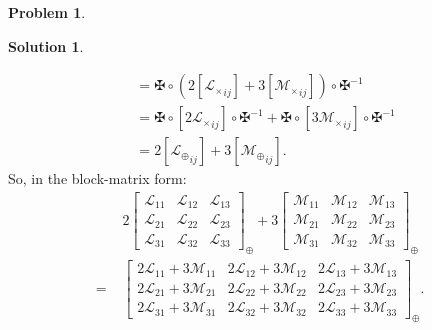 \documentclass{book}
\theoremstyle{definition}
\newtheorem*{prob*}{Problem}
\newtheorem*{sln*}{Solution}
\newcommand{\lag}{\mathcal{L}}
\newcommand{\M}{\mathcal{M}}
\begin{document}
\begin{prob*}
\begin{sln*}
\begin{enumerate}
\begin{enumerate}
\begin{align*}
				[(2\lag_\oplus + 3\M_\oplus)_{ij}]
				&= \maltese\circ \left( 2[{\lag_\times}_{ij} ] + 3[{\M_\times}_{ij} ]  \right) \circ \maltese^{-1}\\
				&= \maltese\circ [2{\lag_\times}_{ij}]\circ \maltese^{-1} + \maltese\circ [3{\M_\times}_{ij}]\circ \maltese^{-1}\\
				&= 2[{\lag_\oplus}_{ij}] + 3[{\M_\oplus}_{ij}].
				\end{align*}
				So, in the block-matrix form:
				\begin{align*}
				&2\begin{bmatrix}
				\lag_{11} & \lag_{12} & \lag_{13}\\
				\lag_{21} & \lag_{22} & \lag_{23}\\
				\lag_{31} & \lag_{32} & \lag_{33}
				\end{bmatrix}_\oplus
				+ 
				3\begin{bmatrix}
				\M_{11} & \M_{12} & \M_{13}\\
				\M_{21} & \M_{22} & \M_{23}\\
				\M_{31} & \M_{32} & \M_{33}
				\end{bmatrix}_\oplus\\
				=\,\, 
				&\begin{bmatrix}
				2\lag_{11} + 3\M_{11} & 2\lag_{12} + 3\M_{12} & 2\lag_{13} + 3\M_{13}\\
				2\lag_{21} + 3\M_{21} & 2\lag_{22} + 3\M_{22} & 2\lag_{23} + 3\M_{23}\\
				2\lag_{31} + 3\M_{31} & 2\lag_{32} + 3\M_{32} & 2\lag_{33} + 3\M_{33}
				\end{bmatrix}_\oplus.
				\end{align*}
				
				
				
				
				
				
				
				
				
				
				
				
				

\end{enumerate}
\end{enumerate}
\end{sln*}
\end{prob*}
\end{document}
